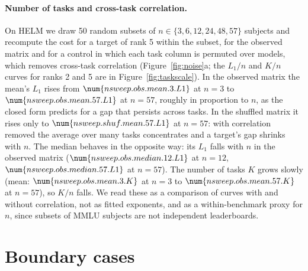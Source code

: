 \paragraph{Number of tasks and cross-task correlation.} On HELM we draw 50 random subsets of $n\in\{3,6,12,24,48,57\}$ subjects and recompute the cost for a target of rank 5 within the subset, for the observed matrix and for a control in which each task column is permuted over models, which removes cross-task correlation (Figure~\ref{fig:noise}a; the $L_1/n$ and $K/n$ curves for ranks 2 and 5 are in Figure~\ref{fig:taskscale}). In the observed matrix the mean's $L_1$ rises from $\num{nsweep.obs.mean.3.L1}$ at $n=3$ to $\num{nsweep.obs.mean.57.L1}$ at $n=57$, roughly in proportion to $n$, as the closed form predicts for a gap that persists across tasks. In the shuffled matrix it rises only to $\num{nsweep.shuf.mean.57.L1}$ at $n=57$: with correlation removed the average over many tasks concentrates and a target's gap shrinks with $n$. The median behaves in the opposite way: its $L_1$ falls with $n$ in the observed matrix ($\num{nsweep.obs.median.12.L1}$ at $n=12$, $\num{nsweep.obs.median.57.L1}$ at $n=57$). The number of tasks $K$ grows slowly (mean: $\num{nsweep.obs.mean.3.K}$ at $n=3$ to $\num{nsweep.obs.mean.57.K}$ at $n=57$), so $K/n$ falls. We read these as a comparison of curves with and without correlation, not as fitted exponents, and as a within-benchmark proxy for $n$, since subsets of MMLU subjects are not independent leaderboards.



\clearpage
\section{Boundary cases}\label{app:boundary}

